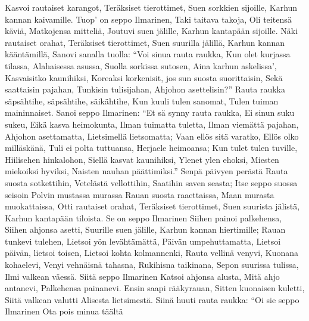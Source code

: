     Kasvoi rautaiset karangot,
    Teräksiset tierottimet,
    Suen sorkkien sijoille,
    Karhun kannan kaivamille.
  \endverse
  \beginverse
    Tuop' on seppo Ilmarinen,
    Taki taitava takoja,
    Oli teitensä käviä,
    Matkojensa mitteliä,
    Joutuvi suen jälille,
    Karhun kantapään sijoille.
    Näki rautaiset orahat,
    Teräksiset tierottimet,
    Suen suurilla jälillä,
    Karhun kannan kääntämillä,
    Sanovi sanalla tuolla:
    ``Voi sinua rauta raukka,
    Kun olet kurjassa tilassa,
    Alahaisessa asussa,
    Suolla sorkissa sutosen,
    Aina karhun askelissa',
    Kasvaisitko kaunihiksi,
    Koreaksi korkenisit,
    jos sun suosta suorittaisin,
    Sekä saattaisin pajahan,
    Tunkisin tulisijahan,
    Ahjohon asettelisin?''
  \endverse
  \beginverse
    Rauta raukka säpsähtihe,
    säpsähtihe, säikähtihe,
    Kun kuuli tulen sanomat,
    Tulen tuiman maininnaiset.
  \endverse
  \beginverse
    Sanoi seppo Ilmarinen:
    ``Et sä synny rauta raukka,
    Ei sinun suku sukeu,
    Eikä kasva heimokunta,
    Ilman tuimatta tuletta,
    Ilman viemättä pajahan,
    Ahjohon asettamatta,
    Lietsimellä lietsomatta;
    Vaan ellös sitä varatko,
    Ellös olko milläskänä,
    Tuli ei polta tuttuansa,
    Herjaele heimoansa;
    Kun tulet tulen tuville,
    Hiilisehen hinkalohon,
    Siellä kasvat kaunihiksi,
    Ylenet ylen ehoksi,
    Miesten miekoiksi hyviksi,
    Naisten nauhan päättimiksi.''
  \endverse
  \beginverse
    Senpä päivyen perästä
    Rauta suosta sotkettihin,
    Vetelästä vellottihin,
    Saatihin saven seasta;
    Itse seppo suossa seisoin
    Polvin mustassa murassa
    Rauan suosta raaettaissa,
    Maan murasta muokattaissa,
    Otti rautaiset orahat,
    Teräksiset tierottimet,
    Suen suurista jälistä,
    Karhun kantapään tiloista.
  \endverse
  \beginverse
    Se on seppo Ilmarinen
    Siihen painoi palkehensa,
    Siihen ahjonsa asetti,
    Suurille suen jälille,
    Karhun kannan hiertimille;
    Rauan tunkevi tulehen,
    Lietsoi yön levähtämättä,
    Päivän umpehuttamatta,
    Lietsoi päivän, lietsoi toisen,
    Lietsoi kohta kolmannenki,
    Rauta vellinä venyvi,
    Kuonana kohaelevi,
    Venyi vehnäisnä tahasna,
    Rukihisna taikinana,
    Sepon suurissa tulissa,
    Ilmi valkean väessä.
  \endverse
  \beginverse
    Siitä seppo Ilmarinen
    Katsoi ahjonsa alusta,
    Mitä ahjo antanevi,
    Palkehensa painanevi.
    Ensin saapi rääkyrauan,
    Sitten kuonaisen kuletti,
    Siitä valkean valutti
    Alisesta lietsimestä.
  \endverse
  \beginverse
    Siinä huuti rauta raukka:
    ``Oi sie seppo Ilmarinen
    Ota pois minua täältä
